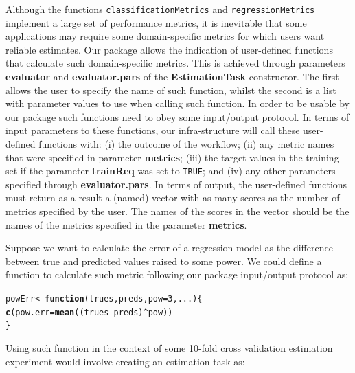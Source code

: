 \documentclass[10pt,a4paper]{article}\usepackage[]{graphicx}\usepackage[]{color}
\makeatletter
\newcommand{\hlnum}[1]{\textcolor[rgb]{0.686,0.059,0.569}{#1}}%
\newcommand{\hlopt}[1]{\textcolor[rgb]{0,0,0}{#1}}%
\newcommand{\hlstd}[1]{\textcolor[rgb]{0.345,0.345,0.345}{#1}}%
\newcommand{\hlkwa}[1]{\textcolor[rgb]{0.161,0.373,0.58}{\textbf{#1}}}%
\newcommand{\hlkwb}[1]{\textcolor[rgb]{0.69,0.353,0.396}{#1}}%
\newcommand{\hlkwc}[1]{\textcolor[rgb]{0.333,0.667,0.333}{#1}}%
\newcommand{\hlkwd}[1]{\textcolor[rgb]{0.737,0.353,0.396}{\textbf{#1}}}%
\newenvironment{kframe}{%
 \def\at@end@of@kframe{}%
 \ifinner\ifhmode%
  \def\at@end@of@kframe{\end{minipage}}%
  \begin{minipage}{\columnwidth}%
 \fi\fi%
 \def\FrameCommand##1{\hskip\@totalleftmargin \hskip-\fboxsep
 \colorbox{shadecolor}{##1}\hskip-\fboxsep
     \hskip-\linewidth \hskip-\@totalleftmargin \hskip\columnwidth}%
 \MakeFramed {\advance\hsize-\width
   \@totalleftmargin\z@ \linewidth\hsize
   \@setminipage}}%
 {\par\unskip\endMakeFramed%
 \at@end@of@kframe}
\newenvironment{knitrout}{}{} %
\makeatother
\begin{document}
Although the functions \texttt{classificationMetrics} and \texttt{regressionMetrics} implement a large set of performance metrics, it is inevitable that some applications may require some domain-specific metrics for which users want reliable estimates. Our package allows the indication of user-defined functions that calculate such domain-specific metrics. This is achieved through parameters \textbf{evaluator} and \textbf{evaluator.pars} of the \textbf{EstimationTask} constructor. The first allows the user to specify the name of such function, whilst the second is a list with parameter values to use when calling such function. In order to be usable by our package such functions need to obey some input/output protocol. In terms of input parameters to these functions, our infra-structure will call these user-defined functions with: (i) the outcome of the workflow; (ii) any metric names that were specified in parameter \textbf{metrics}; (iii) the target values in the training set if the parameter \textbf{trainReq} was set to \texttt{TRUE}; and (iv) any other parameters specified through \textbf{evaluator.pars}. In terms of output, the user-defined functions must return as a result a (named) vector with as many scores as the number of metrics specified by the user. The names of the scores in the vector should be the names of the metrics specified in the parameter \textbf{metrics}.

Suppose we want to calculate the error of a regression model as the difference between true and predicted values raised to some power. We could define a function to calculate such metric following our package input/output protocol as:

\begin{knitrout}\footnotesize
{}\color{fgcolor}\begin{kframe}
\begin{alltt}
\hlstd{powErr} \hlkwb{<-} \hlkwa{function}\hlstd{(}\hlkwc{trues}\hlstd{,}\hlkwc{preds}\hlstd{,}\hlkwc{pow}\hlstd{=}\hlnum{3}\hlstd{,}\hlkwc{...}\hlstd{) \{}
    \hlkwd{c}\hlstd{(}\hlkwc{pow.err} \hlstd{=} \hlkwd{mean}\hlstd{((trues}\hlopt{-}\hlstd{preds)}\hlopt{^}\hlstd{pow))}
\hlstd{\}}
\end{alltt}
\end{kframe}
\end{knitrout}

Using such function in the context of some 10-fold cross validation estimation experiment would involve creating an estimation task as:
\end{document}
